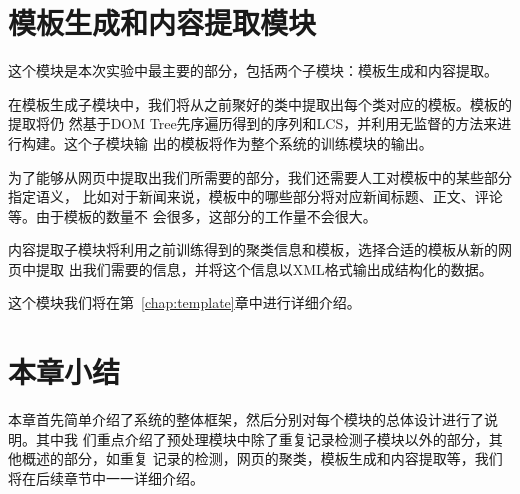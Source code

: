 \section{模板生成和内容提取模块}
\label{sec:templateintro}
这个模块是本次实验中最主要的部分，包括两个子模块：模板生成和内容提取。

在模板生成子模块中，我们将从之前聚好的类中提取出每个类对应的模板。模板的提取将仍
然基于DOM Tree先序遍历得到的序列和LCS，并利用无监督的方法来进行构建。这个子模块输
出的模板将作为整个系统的训练模块的输出。

为了能够从网页中提取出我们所需要的部分，我们还需要人工对模板中的某些部分指定语义，
比如对于新闻来说，模板中的哪些部分将对应新闻标题、正文、评论等。由于模板的数量不
会很多，这部分的工作量不会很大。

内容提取子模块将利用之前训练得到的聚类信息和模板，选择合适的模板从新的网页中提取
出我们需要的信息，并将这个信息以XML格式输出成结构化的数据。

这个模块我们将在第~\ref{chap:template}章中进行详细介绍。
\section{本章小结}
\label{sec:summaryframework}
本章首先简单介绍了系统的整体框架，然后分别对每个模块的总体设计进行了说明。其中我
们重点介绍了预处理模块中除了重复记录检测子模块以外的部分，其他概述的部分，如重复
记录的检测，网页的聚类，模板生成和内容提取等，我们将在后续章节中一一详细介绍。

